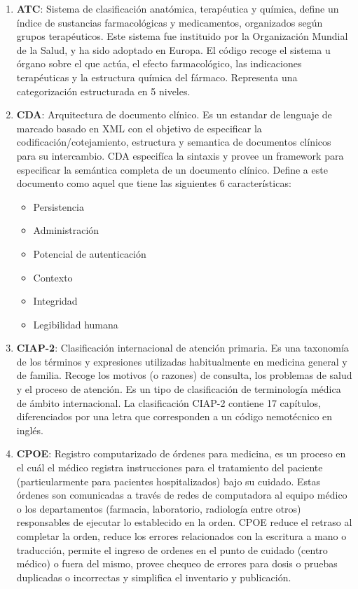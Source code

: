 \begin{enumerate}
    \item\textbf{ATC}: Sistema de clasificación anatómica, terapéutica y química, define un índice de sustancias farmacológicas y medicamentos, organizados según grupos terapéuticos. Este sistema fue instituido por la Organización Mundial de la Salud, y ha sido adoptado en Europa. El código recoge el sistema u órgano sobre el que actúa, el efecto farmacológico, las indicaciones terapéuticas y la estructura química del fármaco. Representa una categorización estructurada en 5 niveles.
    
    \item\textbf{CDA}: Arquitectura de documento clínico. Es un estandar de lenguaje de marcado basado en XML con el objetivo de especificar la codificación/cotejamiento, estructura y semantica de documentos clínicos para su intercambio. CDA especifíca la sintaxis y provee un framework para especificar la semántica completa de un documento clínico. Define a este documento como aquel que tiene las siguientes 6 características:
      \begin{itemize}
          \item Persistencia
          \item Administración
          \item Potencial de autenticación
          \item Contexto
    	  \item Integridad
   		  \item Legibilidad humana
      \end{itemize}
      
    \item\textbf{CIAP-2}: Clasificación internacional de atención primaria. Es una taxonomía de los términos y expresiones utilizadas habitualmente en medicina general y de familia. Recoge los motivos (o razones) de consulta, los problemas de salud y el proceso de atención. Es un tipo de clasificación de terminología médica de ámbito internacional. La clasificación CIAP-2 contiene 17 capítulos, diferenciados por una letra que corresponden a un código nemotécnico en inglés.
    
    \item\textbf{CPOE}: Registro computarizado de órdenes para medicina, es un proceso en el cuál el médico registra instrucciones para el tratamiento del paciente (particularmente para pacientes hospitalizados) bajo su cuidado. Estas órdenes son comunicadas a través de redes de computadora al equipo médico o los departamentos (farmacia, laboratorio, radiología entre otros) responsables de ejecutar lo establecido en la orden. CPOE reduce el retraso al completar la orden, reduce los errores relacionados con la escritura a mano o traducción, permite el ingreso de ordenes en el punto de cuidado (centro médico) o fuera del mismo, provee chequeo de errores para dosis o pruebas duplicadas o incorrectas y simplifica el inventario y publicación.
    

\end{enumerate}
